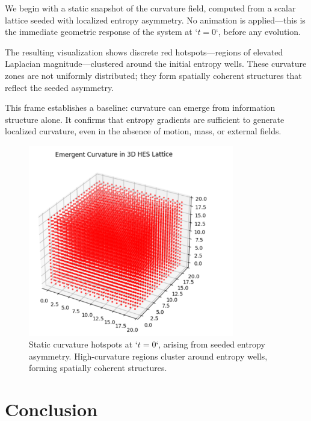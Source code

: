 \documentclass[12pt]{article}
\begin{document}
We begin with a static snapshot of the curvature field, computed from a scalar lattice seeded with localized entropy asymmetry. No animation is applied—this is the immediate geometric response of the system at `\( t = 0 \)`, before any evolution.

The resulting visualization shows discrete red hotspots—regions of elevated Laplacian magnitude—clustered around the initial entropy wells. These curvature zones are not uniformly distributed; they form spatially coherent structures that reflect the seeded asymmetry.

This frame establishes a baseline: curvature can emerge from information structure alone. It confirms that entropy gradients are sufficient to generate localized curvature, even in the absence of motion, mass, or external fields.

\begin{figure}[h]
    \centering
    \includegraphics[width=0.8\textwidth]{Figures/Figure_6.PNG}
    \caption{Static curvature hotspots at `\( t = 0 \)`, arising from seeded entropy asymmetry. High-curvature regions cluster around entropy wells, forming spatially coherent structures.}
    \label{fig:static_curvature}
\end{figure}







\section{Conclusion}
\end{document}
